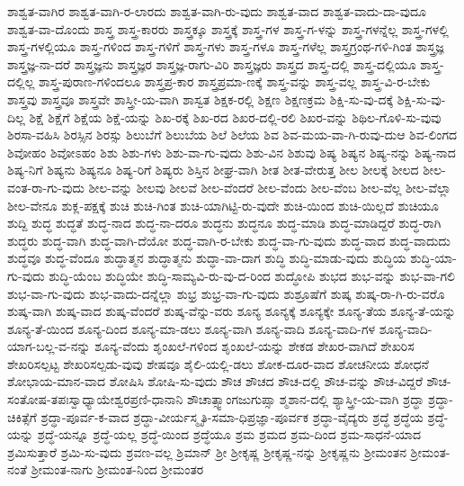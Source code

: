 {ಶಾಶ್ವತ-ವಾಗಿರ
ಶಾಶ್ವತ-ವಾಗಿ-ರ-ಲಾರದು
ಶಾಶ್ವತ-ವಾಗಿ-ರು-ವುದು
ಶಾಶ್ವತ-ವಾದ
ಶಾಶ್ವತ-ವಾದು-ದಾ-ವುದೂ
ಶಾಶ್ವತ-ವಾ-ದೊಂದು
ಶಾಸ್ತ್ರ
ಶಾಸ್ತ್ರ-ಕಾರರು
ಶಾಸ್ತ್ರಕ್ಕೂ
ಶಾಸ್ತ್ರಕ್ಕೆ
ಶಾಸ್ತ್ರ-ಗಳ
ಶಾಸ್ತ್ರ-ಗ-ಳನ್ನು
ಶಾಸ್ತ್ರ-ಗಳನ್ನೆಲ್ಲ
ಶಾಸ್ತ್ರ-ಗಳಲ್ಲಿ
ಶಾಸ್ತ್ರ-ಗಳಲ್ಲಿಯೂ
ಶಾಸ್ತ್ರ-ಗಳಿಂದ
ಶಾಸ್ತ್ರ-ಗಳಿಗೆ
ಶಾಸ್ತ್ರ-ಗಳು
ಶಾಸ್ತ್ರ-ಗಳೂ
ಶಾಸ್ತ್ರ-ಗಳೆಲ್ಲ
ಶಾಸ್ತ್ರಗ್ರಂಥ-ಗಳಿ-ಗಿಂತ
ಶಾಸ್ತ್ರಜ್ಞ
ಶಾಸ್ತ್ರಜ್ಞ-ನಾ-ದರೆ
ಶಾಸ್ತ್ರಜ್ಞನು
ಶಾಸ್ತ್ರಜ್ಞರ
ಶಾಸ್ತ್ರಜ್ಞ-ರಾಗು-ವಿರಿ
ಶಾಸ್ತ್ರಜ್ಞರು
ಶಾಸ್ತ್ರದ
ಶಾಸ್ತ್ರ-ದಲ್ಲಿ
ಶಾಸ್ತ್ರ-ದಲ್ಲಿಯೂ
ಶಾಸ್ತ್ರ-ದಲ್ಲಿಲ್ಲ
ಶಾಸ್ತ್ರ-ಪುರಾಣ-ಗಳಿಂದಲೂ
ಶಾಸ್ತ್ರಪ್ರ-ಕಾರ
ಶಾಸ್ತ್ರಪ್ರಮಾ-ಣಕ್ಕೆ
ಶಾಸ್ತ್ರ-ವನ್ನು
ಶಾಸ್ತ್ರ-ವಲ್ಲ
ಶಾಸ್ತ್ರ-ವಿ-ರ-ಬೇಕು
ಶಾಸ್ತ್ರವು
ಶಾಸ್ತ್ರವೂ
ಶಾಸ್ತ್ರವೇ
ಶಾಸ್ತ್ರೀ-ಯ-ವಾಗಿ
ಶಾಸ್ವತ
ಶಿಕ್ಷಕ-ರಲ್ಲಿ
ಶಿಕ್ಷಣ
ಶಿಕ್ಷಣಕ್ರಮ
ಶಿಕ್ಷಿ-ಸು-ವು-ದಕ್ಕೆ
ಶಿಕ್ಷಿ-ಸು-ವು-ದಿಲ್ಲ
ಶಿಕ್ಷೆ
ಶಿಕ್ಷೆಗೆ
ಶಿಕ್ಷೆಯ
ಶಿಕ್ಷೆ-ಯನ್ನು
ಶಿಖ-ರಕ್ಕೆ
ಶಿಖ-ರದ
ಶಿಖರ-ದಲ್ಲಿ-ರಲಿ
ಶಿಖರ-ವನ್ನು
ಶಿಥಿಲ-ಗೊಳಿ-ಸು-ವುವು
ಶಿರಸಾ-ವಹಿಸಿ
ಶಿರಸ್ಸಿನ
ಶಿರಸ್ಸು
ಶಿಲುಬೆಗೆ
ಶಿಲುಬೆಯ
ಶಿಲೆ
ಶಿಲೆಯ
ಶಿವ
ಶಿವ-ಮಯ-ವಾ-ಗಿ-ರುವು-ದುಆ
ಶಿವ-ಲಿಂಗದ
ಶಿವೋಹಂ
ಶಿವೋಽಹಂ
ಶಿಶು
ಶಿಶು-ಗಳು
ಶಿಶು-ವಾ-ಗು-ವುದು
ಶಿಶು-ವಿನ
ಶಿಶುವು
ಶಿಷ್ಯ
ಶಿಷ್ಯನ
ಶಿಷ್ಯ-ನನ್ನು
ಶಿಷ್ಯ-ನಾದ
ಶಿಷ್ಯ-ನಿಗೆ
ಶಿಷ್ಯನು
ಶಿಷ್ಯನೂ
ಶಿಷ್ಯ-ರಿಗೆ
ಶಿಷ್ಯರು
ಶಿಸ್ತಿನ
ಶೀಘ್ರ-ವಾಗಿ
ಶೀತ
ಶೀತ-ವೇರುತ್ತ
ಶೀಲ
ಶೀಲಕ್ಕೆ
ಶೀಲದ
ಶೀಲ-ವಂತ-ರಾ-ಗು-ವುದು
ಶೀಲ-ವನ್ನು
ಶೀಲವು
ಶೀಲವೆ
ಶೀಲ-ವೆಂದರೆ
ಶೀಲ-ವೆಂದು
ಶೀಲ-ವೆಂಬ
ಶೀಲ-ವೆಲ್ಲ
ಶೀಲ-ವೆಲ್ಲಾ
ಶೀಲ-ವೇನೂ
ಶುಕ್ಲ-ಪಕ್ಷಕ್ಕೆ
ಶುಚಿ
ಶುಚಿ-ಗಿಂತ
ಶುಚಿ-ಯಾಗಿಟ್ಟಿ-ರು-ವುದೇ
ಶುಚಿ-ಯಿಂದ
ಶುಚಿ-ಯಿಲ್ಲದೆ
ಶುಚಿಯೂ
ಶುದ್ದಿ
ಶುದ್ಧ
ಶುದ್ಧತೆ
ಶುದ್ಧ-ನಾದ
ಶುದ್ಧ-ನಾ-ದರೂ
ಶುದ್ಧನು
ಶುದ್ಧನೂ
ಶುದ್ಧ-ಮಾಡಿ
ಶುದ್ಧ-ಮಾಡಿದ್ದರೆ
ಶುದ್ಧ-ರಾಗಿ
ಶುದ್ಧರು
ಶುದ್ಧ-ವಾಗಿ
ಶುದ್ಧ-ವಾಗಿ-ದೆಯೋ
ಶುದ್ಧ-ವಾಗಿ-ರ-ಬೇಕು
ಶುದ್ಧ-ವಾ-ಗು-ವುದು
ಶುದ್ಧ-ವಾದ
ಶುದ್ಧ-ವಾದುದು
ಶುದ್ಧವೂ
ಶುದ್ಧ-ವೆಂದೂ
ಶುದ್ಧಾತ್ಮನ
ಶುದ್ಧಾತ್ಮನು
ಶುದ್ಧಾ-ವಾ-ದಾಗ
ಶುದ್ಧಿ
ಶುದ್ಧಿ-ಮಾಡು-ವುದು
ಶುದ್ಧಿಯ
ಶುದ್ಧಿ-ಯಾ-ಗು-ವುದು
ಶುದ್ಧಿ-ಯೆಂಬ
ಶುದ್ಧಿಯೇ
ಶುದ್ಧಿ-ಸಾಮ್ಯವಿ-ರು-ವು-ದ-ರಿಂದ
ಶುದ್ಧೋಪಿ
ಶುಭದ
ಶುಭ-ವನ್ನು
ಶುಭ-ವಾ-ಗಲಿ
ಶುಭ-ವಾ-ಗು-ವುದು
ಶುಭ-ವಾದು-ದನ್ನೆಲ್ಲಾ
ಶುಭ್ರ
ಶುಭ್ರ-ವಾ-ಗು-ವುದು
ಶುಶ್ರೂಷೆಗೆ
ಶುಷ್ಕ
ಶುಷ್ಕ-ರಾ-ಗಿ-ರು-ವರೊ
ಶುಷ್ಕ-ವಾಗಿ
ಶುಷ್ಕ-ವಾದ
ಶುಷ್ಕ-ವೆಂದರೆ
ಶುಷ್ಕ-ವೆನ್ನು-ವರು
ಶೂನ್ಯ
ಶೂನ್ಯಕ್ಕೆ
ಶೂನ್ಯಕ್ಕೇ
ಶೂನ್ಯ-ತೆಯ
ಶೂನ್ಯ-ತೆ-ಯನ್ನು
ಶೂನ್ಯ-ತೆ-ಯಿಂದ
ಶೂನ್ಯ-ದಿಂದ
ಶೂನ್ಯ-ಮಾ-ಡಲು
ಶೂನ್ಯ-ವಾಗಿ
ಶೂನ್ಯ-ವಾದಿ
ಶೂನ್ಯ-ವಾದಿ-ಗಳ
ಶೂನ್ಯ-ವಾದಿ-ಯಾಗ-ಬಲ್ಲ-ವ-ನನ್ನು
ಶೂನ್ಯ-ವೆಂದು
ಶೃಂಖಲೆ-ಗಳಿಂದ
ಶೃಂಖಲೆ-ಯನ್ನು
ಶೇಕಡ
ಶೇಖರ-ವಾಗಿದೆ
ಶೇಖರಿಸ
ಶೇಖರಿಸಲ್ಪಟ್ಟ
ಶೇಖರಿಸಲ್ಪಡು-ವುವು
ಶೇಷವೂ
ಶೈಲಿ-ಯಲ್ಲಿ-ಡಲು
ಶೋಕ-ದೂರ-ವಾದ
ಶೋಚನೀಯ
ಶೋಧನೆ
ಶೋಭಾಯ-ಮಾನ-ವಾದ
ಶೋಷಿಸಿ
ಶೋಷಿ-ಸು-ವುದು
ಶೌಚ
ಶೌಚದ
ಶೌಚ-ದಲ್ಲಿ
ಶೌಚ-ವನ್ನು
ಶೌಚ-ವಿದ್ದರೆ
ಶೌಚ-ಸಂತೋಷ-ತಪಃಸ್ವಾಧ್ಯಾಯೇಶ್ವರಪ್ರಣಿ-ಧಾನಾನಿ
ಶೌಚಾತ್ಸ್ವಾಂಗಜುಗುಪ್ಸಾ
ಶ್ಮಶಾನ-ದಲ್ಲಿ
ಶ್ಯಾಸ್ತ್ರೀ-ಯ-ವಾಗಿ
ಶ್ರದ್ಧಾ
ಶ್ರದ್ಧಾ-ಚಿಕಿತ್ಸೆಗೆ
ಶ್ರದ್ಧಾ-ಪೂರ್ವ-ಕ-ವಾದ
ಶ್ರದ್ಧಾ-ವೀರ್ಯಸ್ಮೃತಿ-ಸಮಾ-ಧಿಪ್ರಜ್ಞಾ-ಪೂರ್ವಕ
ಶ್ರದ್ಧಾ-ವೈದ್ಯರು
ಶ್ರದ್ಧೆ
ಶ್ರದ್ಧೆಯ
ಶ್ರದ್ಧೆ-ಯನ್ನು
ಶ್ರದ್ಧೆ-ಯನ್ನೂ
ಶ್ರದ್ಧೆ-ಯಲ್ಲ
ಶ್ರದ್ಧೆ-ಯಿಂದ
ಶ್ರದ್ಧೆಯೂ
ಶ್ರಮ
ಶ್ರಮದ
ಶ್ರಮ-ದಿಂದ
ಶ್ರಮ-ಸಾಧನೆ-ಯಾದ
ಶ್ರಮಿಸುತ್ತಾರೆ
ಶ್ರಮಿ-ಸು-ವುದು
ಶ್ರವಣ-ವಲ್ಲ
ಶ್ರಿಮಾನ್
ಶ್ರೀ
ಶ್ರೀಕೃಷ್ಣ
ಶ್ರೀಕೃಷ್ಣ-ನನ್ನು
ಶ್ರೀಕೃಷ್ಣನು
ಶ್ರೀಮಂತನ
ಶ್ರೀಮಂತ-ನಂತೆ
ಶ್ರೀಮಂತ-ನಾಗು
ಶ್ರೀಮಂತ-ನಿಂದ
ಶ್ರೀಮಂತರ
}
